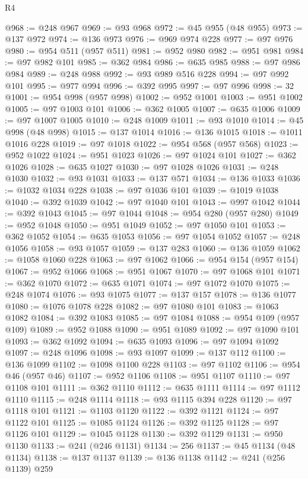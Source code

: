 \begin{lexlean}{R4}
\begin{coremodule}
@968 := @248 @967
@969 := @93 @968
@972 := @45 @955 (@48 @955)
@973 := @137 @972
@974 := @136 @973
@976 := @969 @974 @228
@977 := @97 @976
@980 := @954 @511 (@957 @511)
@981 := @952 @980
@982 := @951 @981
@984 := @97 @982 @101
@985 := @362 @984
@986 := @635 @985
@988 := @97 @986 @984
@989 := @248 @988
@992 := @93 @989 @516 @228
@994 := @97 @992 @101
@995 := @977 @994
@996 := @392 @995
@997 := @97 @996
@998 := 32
@1001 := @954 @998 (@957 @998)
@1002 := @952 @1001
@1003 := @951 @1002
@1005 := @97 @1003 @101
@1006 := @362 @1005
@1007 := @635 @1006
@1009 := @97 @1007 @1005
@1010 := @248 @1009
@1011 := @93 @1010
@1014 := @45 @998 (@48 @998)
@1015 := @137 @1014
@1016 := @136 @1015
@1018 := @1011 @1016 @228
@1019 := @97 @1018
@1022 := @954 @568 (@957 @568)
@1023 := @952 @1022
@1024 := @951 @1023
@1026 := @97 @1024 @101
@1027 := @362 @1026
@1028 := @635 @1027
@1030 := @97 @1028 @1026
@1031 := @248 @1030
@1032 := @93 @1031
@1033 := @137 @571
@1034 := @136 @1033
@1036 := @1032 @1034 @228
@1038 := @97 @1036 @101
@1039 := @1019 @1038
@1040 := @392 @1039
@1042 := @97 @1040 @101
@1043 := @997 @1042
@1044 := @392 @1043
@1045 := @97 @1044
@1048 := @954 @280 (@957 @280)
@1049 := @952 @1048
@1050 := @951 @1049
@1052 := @97 @1050 @101
@1053 := @362 @1052
@1054 := @635 @1053
@1056 := @97 @1054 @1052
@1057 := @248 @1056
@1058 := @93 @1057
@1059 := @137 @283
@1060 := @136 @1059
@1062 := @1058 @1060 @228
@1063 := @97 @1062
@1066 := @954 @154 (@957 @154)
@1067 := @952 @1066
@1068 := @951 @1067
@1070 := @97 @1068 @101
@1071 := @362 @1070
@1072 := @635 @1071
@1074 := @97 @1072 @1070
@1075 := @248 @1074
@1076 := @93 @1075
@1077 := @137 @157
@1078 := @136 @1077
@1080 := @1076 @1078 @228
@1082 := @97 @1080 @101
@1083 := @1063 @1082
@1084 := @392 @1083
@1085 := @97 @1084
@1088 := @954 @109 (@957 @109)
@1089 := @952 @1088
@1090 := @951 @1089
@1092 := @97 @1090 @101
@1093 := @362 @1092
@1094 := @635 @1093
@1096 := @97 @1094 @1092
@1097 := @248 @1096
@1098 := @93 @1097
@1099 := @137 @112
@1100 := @136 @1099
@1102 := @1098 @1100 @228
@1103 := @97 @1102
@1106 := @954 @46 (@957 @46)
@1107 := @952 @1106
@1108 := @951 @1107
@1110 := @97 @1108 @101
@1111 := @362 @1110
@1112 := @635 @1111
@1114 := @97 @1112 @1110
@1115 := @248 @1114
@1118 := @93 @1115 @394 @228
@1120 := @97 @1118 @101
@1121 := @1103 @1120
@1122 := @392 @1121
@1124 := @97 @1122 @101
@1125 := @1085 @1124
@1126 := @392 @1125
@1128 := @97 @1126 @101
@1129 := @1045 @1128
@1130 := @392 @1129
@1131 := @950 @1130
@1133 := @241 (@246 @1131)
@1134 := 256
@1137 := @45 @1134 (@48 @1134)
@1138 := @137 @1137
@1139 := @136 @1138
@1142 := @241 (@256 @1139) @259

\end{coremodule}
\end{lexlean}
